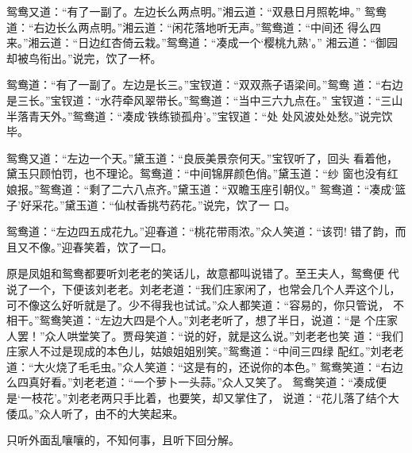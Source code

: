 鸳鸯又道：“有了一副了。左边长么两点明。”湘云道：“双悬日月照乾坤。”
鸳鸯道：“右边长么两点明。”湘云道：“闲花落地听无声。”鸳鸯道：“中间还
得么四来。”湘云道：“日边红杏倚云栽。”鸳鸯道：“凑成一个‘樱桃九熟’。”
湘云道：“御园却被鸟衔出。”说完，饮了一杯。

鸳鸯道：“有了一副了。左边是长三。”宝钗道：“双双燕子语梁间。”鸳鸯
道：“右边是三长。”宝钗道：“水荇牵风翠带长。”鸳鸯道：“当中三六九点在。”
宝钗道：“三山半落青天外。”鸳鸯道：“凑成‘铁练锁孤舟’。”宝钗道：“处
处风波处处愁。”说完饮毕。

鸳鸯又道：“左边一个天。”黛玉道：“良辰美景奈何天。”宝钗听了，回头
看着他，黛玉只顾怕罚，也不理论。鸳鸯道：“中间锦屏颜色俏。”黛玉道：“纱
窗也没有红娘报。”鸳鸯道：“剩了二六八点齐。”黛玉道：“双瞻玉座引朝仪。”
鸳鸯道：“凑成‘篮子’好采花。”黛玉道：“仙杖香挑芍药花。”说完，饮了一
口。

鸳鸯道：“左边四五成花九。”迎春道：“桃花带雨浓。”众人笑道：“该罚!
错了韵，而且又不像。”迎春笑着，饮了一口。

原是凤姐和鸳鸯都要听刘老老的笑话儿，故意都叫说错了。至王夫人，鸳鸯便
代说了一个，下便该刘老老。刘老老道：“我们庄家闲了，也常会几个人弄这个儿，
可不像这么好听就是了。少不得我也试试。”众人都笑道：“容易的，你只管说，
不相干。”鸳鸯笑道：“左边大四是个人。”刘老老听了，想了半日，说道：“是
个庄家人罢！”众人哄堂笑了。贾母笑道：“说的好，就是这么说。”刘老老也笑
道：“我们庄家人不过是现成的本色儿，姑娘姐姐别笑。”鸳鸯道：“中间三四绿
配红。”刘老老道：“大火烧了毛毛虫。”众人笑道：“这是有的，还说你的本色。”
鸳鸯笑道：“右边么四真好看。”刘老老道：“一个萝卜一头蒜。”众人又笑了。
鸳鸯笑道：“凑成便是‘一枝花’。”刘老老两只手比着，也要笑，却又掌住了，
说道：“花儿落了结个大倭瓜。”众人听了，由不的大笑起来。

只听外面乱嚷嚷的，不知何事，且听下回分解。